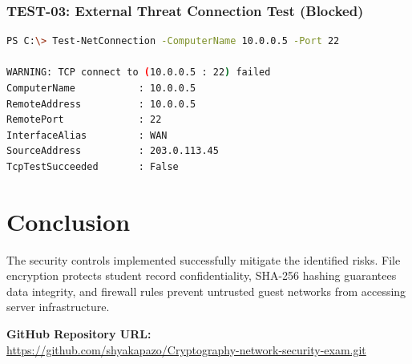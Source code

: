 \documentclass[12pt,a4paper]{article}
\begin{document}
\subsubsection*{TEST-03: External Threat Connection Test (Blocked)}
\begin{lstlisting}[language=bash]
PS C:\> Test-NetConnection -ComputerName 10.0.0.5 -Port 22

WARNING: TCP connect to (10.0.0.5 : 22) failed
ComputerName           : 10.0.0.5
RemoteAddress          : 10.0.0.5
RemotePort             : 22
InterfaceAlias         : WAN
SourceAddress          : 203.0.113.45
TcpTestSucceeded       : False
\end{lstlisting}

\section{Conclusion}
The security controls implemented successfully mitigate the identified risks. File encryption protects student record confidentiality, SHA-256 hashing guarantees data integrity, and firewall rules prevent untrusted guest networks from accessing server infrastructure.

\vspace{0.5cm}
\noindent\textbf{GitHub Repository URL:} \\
\url{https://github.com/shyakapazo/Cryptography-network-security-exam.git}
\end{document}
